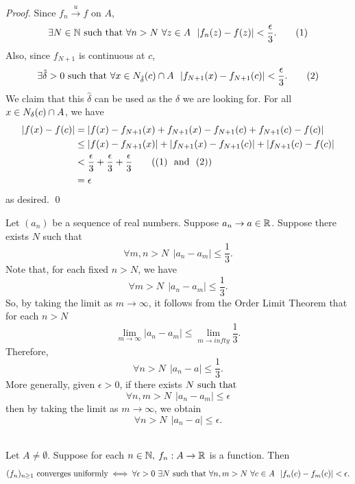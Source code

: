 \begin{proof}
    Since $f_n \overset{u}{\to}f$ on $A$,
    \[\exists N \in \mathbb{N} \text{ such that } \forall n > N ~\forall z \in A ~~|f_n(z) - f(z)| < \frac{\epsilon}{3}. \tag{1}\]
    Also, since $f_{N+1}$ is continuous at $c$,
    \[\exists \hat{\delta} > 0 \text{ such that } \forall x \in N_{\hat{\delta}}(c)\cap A ~~|f_{N+1}(x) - f_{N+1}(c)| < \frac{\epsilon}{3}. \tag{2}\]
    We claim that this $\hat{\delta}$ can be used as the $\delta$ we are looking for. For all $x \in N_{\delta}(c)\cap A$, we have
    \begin{align*}
        |f(x) - f(c)| &= |f(x) -f_{N+1}(x) + f_{N+1}(x) - f_{N+1}(c) + f_{N+1}(c) - f(c)| \\
        &\leq |f(x) - f_{N+1}(x)| + |f_{N+1}(x) - f_{N+1}(c)| + |f_{N+1}(c) - f(c)| \\
        &< \frac{\epsilon}{3}+\frac{\epsilon}{3}+\frac{\epsilon}{3} \tag{(1) \text{ and } (2)}\\
        &= \epsilon
    \end{align*}
    as desired.
    \qed
\end{proof}

\begin{observation}
    Let $(a_n)$ be a sequence of real numbers. Suppose $a_n \to a \in \mathbb{R}$. Suppose there exists $N$ such that 
    $$\forall m, n > N ~~|a_n - a_m| \leq \frac{1}{3}.$$
    Note that, for each fixed $n > N$, we have
    $$\forall m > N ~~|a_n - a_m| \leq \frac{1}{3}.$$
    So, by taking the limit as $m \to \infty$, it follows from the Order Limit Theorem that for each $n > N$
    $$\lim_{m\to \infty}|a_n - a_m| \leq \lim_{m\to infty} \frac{1}{3}.$$
    Therefore,
    $$\forall n > N ~~|a_n - a| \leq \frac{1}{3}.$$
    More generally, given $\epsilon > 0$, if there exists $N \text{ such that }$
    $$\forall n,m > N ~~|a_n - a_m| \leq \epsilon$$
    then by taking the limit as $m \to \infty$, we obtain
    $$\forall n > N ~~|a_n - a| \leq \epsilon.$$
\end{observation}

\begin{theorem} \leavevmode \\
    \label{Thm7.3}
    Let $A \neq \emptyset$. Suppose for each $n \in \mathbb{N},$ $f_n: A \to \mathbb{R}$ is a function. Then
    $$(f_n)_{n\geq 1} \text{ converges uniformly} \iff \forall \epsilon > 0 ~\exists N \text{ such that } \forall n,m > N ~\forall c \in A ~~|f_n(c) - f_m(c)| < \epsilon.$$
\end{theorem}

